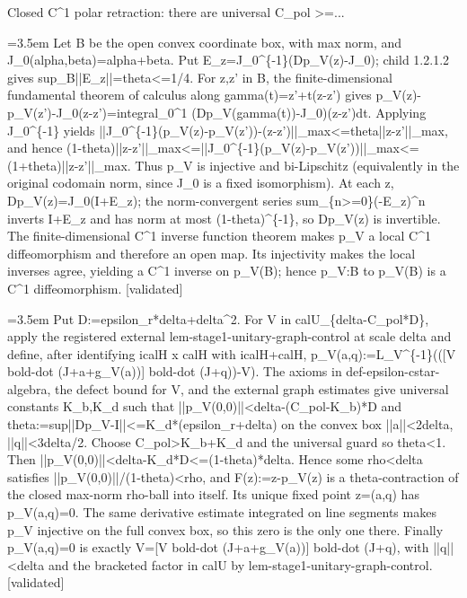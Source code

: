 \documentclass{article}
\newcommand{\step}[1]{\par\noindent\hangindent=3.5em\hangafter=1%
  \makebox[3.5em][l]{\textbf{#1.}}}
\newcommand{\steptag}[1]{\hfill{\small\textsf{[#1]}}}
\begin{document}
\begin{proofbox}{Closed C\textasciicircum{}1 polar retraction: there are universal C\_pol >=...}
\step{1.2.1.3} Let B be the open convex coordinate box, with max norm, and J\_0(alpha,beta)=alpha+beta. Put E\_z=J\_0\textasciicircum{}\{-1\}(Dp\_V(z)-J\_0); child 1.2.1.2 gives sup\_B||E\_z||=theta<=1/4. For z,z' in B, the finite-dimensional fundamental theorem of calculus along gamma(t)=z'+t(z-z') gives p\_V(z)-p\_V(z')-J\_0(z-z')=integral\_0\textasciicircum{}1 (Dp\_V(gamma(t))-J\_0)(z-z')dt. Applying J\_0\textasciicircum{}\{-1\} yields ||J\_0\textasciicircum{}\{-1\}(p\_V(z)-p\_V(z'))-(z-z')||\_max<=theta||z-z'||\_max, and hence (1-theta)||z-z'||\_max<=||J\_0\textasciicircum{}\{-1\}(p\_V(z)-p\_V(z'))||\_max<=(1+theta)||z-z'||\_max. Thus p\_V is injective and bi-Lipschitz (equivalently in the original codomain norm, since J\_0 is a fixed isomorphism). At each z, Dp\_V(z)=J\_0(I+E\_z); the norm-convergent series sum\_\{n>=0\}(-E\_z)\textasciicircum{}n inverts I+E\_z and has norm at most (1-theta)\textasciicircum{}\{-1\}, so Dp\_V(z) is invertible. The finite-dimensional C\textasciicircum{}1 inverse function theorem makes p\_V a local C\textasciicircum{}1 diffeomorphism and therefore an open map. Its injectivity makes the local inverses agree, yielding a C\textasciicircum{}1 inverse on p\_V(B); hence p\_V:B to p\_V(B) is a C\textasciicircum{}1 diffeomorphism. \steptag{validated} \\[4pt]
\step{1.2.2} Put D:=epsilon\_r*delta+delta\textasciicircum{}2. For V in calU\_\{delta-C\_pol*D\}, apply the registered external lem-stage1-unitary-graph-control at scale delta and define, after identifying icalH x calH with icalH+calH, p\_V(a,q):=L\_V\textasciicircum{}\{-1\}(([V bold-dot (J+a+g\_V(a))] bold-dot (J+q))-V). The axioms in def-epsilon-cstar-algebra, the defect bound for V, and the external graph estimates give universal constants K\_b,K\_d such that ||p\_V(0,0)||<delta-(C\_pol-K\_b)*D and theta:=sup||Dp\_V-I||<=K\_d*(epsilon\_r+delta) on the convex box ||a||<2delta, ||q||<3delta/2. Choose C\_pol>K\_b+K\_d and the universal guard so theta<1. Then ||p\_V(0,0)||<delta-K\_d*D<=(1-theta)*delta. Hence some rho<delta satisfies ||p\_V(0,0)||/(1-theta)<rho, and F(z):=z-p\_V(z) is a theta-contraction of the closed max-norm rho-ball into itself. Its unique fixed point z=(a,q) has p\_V(a,q)=0. The same derivative estimate integrated on line segments makes p\_V injective on the full convex box, so this zero is the only one there. Finally p\_V(a,q)=0 is exactly V=[V bold-dot (J+a+g\_V(a))] bold-dot (J+q), with ||q||<delta and the bracketed factor in calU by lem-stage1-unitary-graph-control. \steptag{validated} \\[6pt]

\end{proofbox}
\end{document}
